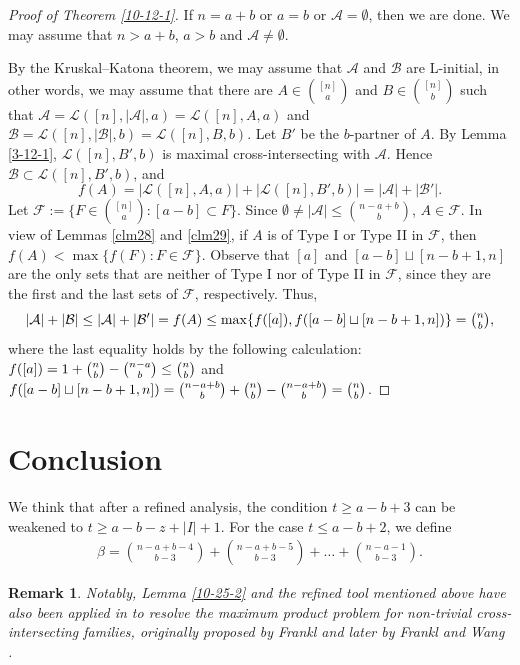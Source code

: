\documentclass[11pt]{article}
\def\marrow{{\boldmath {\marginpar[\hfill$\rightarrow \rightarrow$]{$\leftarrow \leftarrow$}}}}
\def\andrey#1{{\sc Andrey: }{\marrow\sf \textcolor{blue}{#1}}}
\newcommand{\m}{\mathcal}
\newtheorem*{remark*}{Remark} %
\begin{document}
\begin{proof}[Proof of Theorem \ref{10-12-1}]
If $n=a+b$ or $a=b$ or $\m A=\emptyset$, then we are done. We may assume that $n>a+b$, $a>b$ and $\m A\ne\emptyset$. 

By the Kruskal--Katona theorem, we may assume that $\mathcal{A}$ and $\mathcal{B}$ are L-initial, in other words, we may assume that there are $A\in {[n]\choose a}$ and $B\in {[n]\choose b}$ such that 
$\mathcal{A}=\mathcal{L}([n], |\mathcal{A}|, a)=\mathcal{L}([n], A, a)$ and $\mathcal{B}=\mathcal{L}([n], |\mathcal{B}|, b)=\mathcal{L}([n], B, b).$
Let $B'$ be the $b$-partner of $A$. 
By Lemma \ref{3-12-1}, $\m L([n], B', b)$ is maximal cross-intersecting with $\m A$. Hence $\m B\subset \m L([n], B', b)$, and 
\[
f(A)=|\mathcal{L}([n], A, a)|+|\mathcal{L}([n], B', b)|=|\m A|+|\m B'|.
\]
Let $\m F:=\{F\in {[n]\choose a}: [a-b]\subset F\}$.
Since $\emptyset\ne |\m A|\le {n-a+b\choose b}$, $A\in \m F$. 
In view of Lemmas \ref{clm28} and \ref{clm29},
if $A$ is of Type I or Type II in $\m F$, then $f(A)<\max \{f(F): F\in \m F\}$. 
Observe that $[a]$ and $[a-b]\sqcup[n-b+1,n]$ are the only sets that are neither of Type I nor of Type II in $\m F$, since they are the first and the last sets of $\m F$, respectively.  
Thus,
\[
|\m A|+|\m B|\le |\m A|+|\m B'|=f(A)\le \max \{f([a]), f([a-b]\sqcup[n-b+1,n])\}=\tbinom{n}{b},
\]
where the last equality holds by the following calculation: $f([a])=1+\tbinom{n}{b}-\tbinom{n-a}{b}\le \tbinom{n}{b}$ and $f([a-b]\sqcup[n-b+1,n])=\tbinom{n-a+b}{b}+\tbinom{n}{b}-\tbinom{n-a+b}{b}= \tbinom{n}{b}$.
\end{proof}





\iffalse
\section{Conclusion}
We think that after a refined analysis, the condition $t\ge a-b+3$ can be weakened to $t\ge a-b-z+|I|+1$. 
For the case $t\le a-b+2$, we define
\begin{align*}
\beta={n-a+b-4\choose b-3}+{n-a+b-5\choose b-3}+\dots+{n-a-1\choose b-3}.
\end{align*}

\begin{remark*}
Notably, Lemma \ref{10-25-2} and the refined tool mentioned above have also been applied in \cite{huang-product} to resolve the maximum product problem for non-trivial cross-intersecting families, originally proposed by Frankl \cite{2-27-1} and later by Frankl and Wang \cite{11-6-1}.
\end{remark*}
\end{document}
